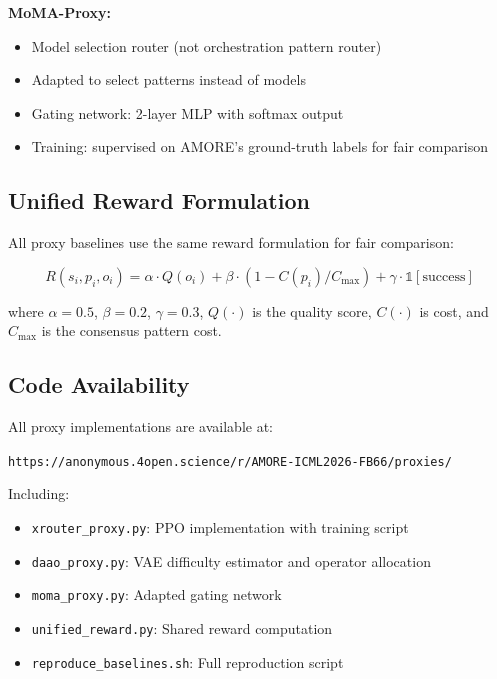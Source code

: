 \documentclass{article}
\theoremstyle{plain}
\theoremstyle{definition}
\theoremstyle{remark}
\begin{document}
\textbf{MoMA-Proxy:}
\begin{itemize}[nosep,leftmargin=*]
\item Model selection router (not orchestration pattern router)
\item Adapted to select patterns instead of models
\item Gating network: 2-layer MLP with softmax output
\item Training: supervised on AMORE's ground-truth labels for fair comparison
\end{itemize}

\subsection{Unified Reward Formulation}

All proxy baselines use the same reward formulation for fair comparison:

\begin{equation}
R(s_i, p_i, o_i) = \alpha \cdot Q(o_i) + \beta \cdot (1 - C(p_i)/C_{\max}) + \gamma \cdot \mathbb{1}[\text{success}]
\end{equation}

where $\alpha=0.5$, $\beta=0.2$, $\gamma=0.3$, $Q(\cdot)$ is the quality score, $C(\cdot)$ is cost, and $C_{\max}$ is the consensus pattern cost.

\subsection{Code Availability}

All proxy implementations are available at:
\begin{center}
\texttt{https://anonymous.4open.science/r/AMORE-ICML2026-FB66/proxies/}
\end{center}

Including:
\begin{itemize}[nosep,leftmargin=*]
\item \texttt{xrouter\_proxy.py}: PPO implementation with training script
\item \texttt{daao\_proxy.py}: VAE difficulty estimator and operator allocation
\item \texttt{moma\_proxy.py}: Adapted gating network
\item \texttt{unified\_reward.py}: Shared reward computation
\item \texttt{reproduce\_baselines.sh}: Full reproduction script
\end{itemize}
\end{document}
